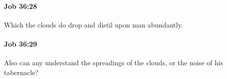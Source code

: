 		\paragraph{Job 36:28} %
			\label{JOB-36-28}

			Which the clouds do drop and distil upon man abundantly.


		\paragraph{Job 36:29} %
			\label{JOB-36-29}

			Also can any understand the spreadings of the clouds, or the noise of his tabernacle?


